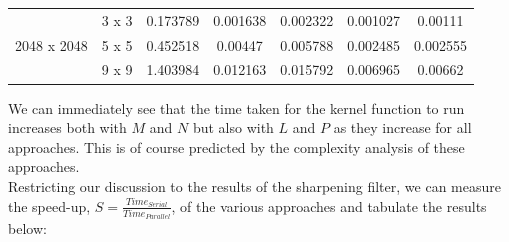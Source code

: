 \documentclass[10pt]{article}
\begin{document}
\begin{table}[H]
\begin{tabular}{ccccccc}
\multirow{3}{*}{2048 x 2048} & 3 x 3                & 0.173789             & 0.001638            & 0.002322                    & 0.001027                      & 0.00111                      \\
                             & 5 x 5                & 0.452518             & 0.00447             & 0.005788                    & 0.002485                      & 0.002555                     \\
                             & 9 x 9                & 1.403984             & 0.012163            & 0.015792                    & 0.006965                      & 0.00662                     
\end{tabular}
\end{table}
We can immediately see that the time taken for the kernel function to run increases both with $M$ and $N$ but also with $L$ and $P$ as they increase for all approaches. This is of course predicted by the complexity analysis of these approaches.
\\
Restricting our discussion to the results of the sharpening filter, we can measure the speed-up, $S = \frac{Time_{Serial}}{Time_{Parallel}}$, of the various approaches and tabulate the results below:
\end{document}
